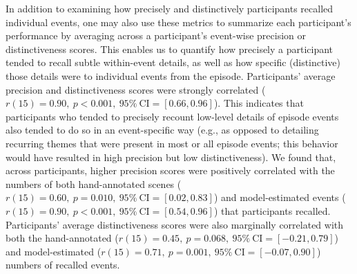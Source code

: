 \documentclass[10pt]{article}
\begin{document}
In addition to examining how precisely and distinctively participants recalled individual events, one may also use these metrics to summarize each participant's performance by averaging across a participant's event-wise precision or distinctiveness scores.  This enables us to quantify how precisely a participant tended to recall subtle within-event details, as well as how specific (distinctive) those details were to individual events from the episode.  Participants' average precision and distinctiveness scores were strongly correlated ($r(15) = 0.90,~p < 0.001,~95\%~\mathrm{CI} = [0.66, 0.96]$).  This indicates that participants who tended to precisely recount low-level details of episode events also tended to do so in an event-specific way (e.g., as opposed to detailing recurring themes that were present in most or all episode events; this behavior would have resulted in high precision but low distinctiveness).  We found that, across participants, higher precision scores were positively correlated with the numbers of both hand-annotated scenes ($r(15) = 0.60,~p = 0.010,~95\%~\mathrm{CI} = [0.02, 0.83]$) and model-estimated events ($r(15) = 0.90,~p < 0.001,~95\%~\mathrm{CI} = [0.54, 0.96]$) that participants recalled.  Participants' average distinctiveness scores were also marginally correlated with both the hand-annotated ($r(15) = 0.45,~p = 0.068,~95\%~\mathrm{CI} = [-0.21, 0.79]$) and model-estimated ($r(15) = 0.71,~p = 0.001,~95\%~\mathrm{CI} = [-0.07, 0.90]$) numbers of recalled events.
\end{document}

